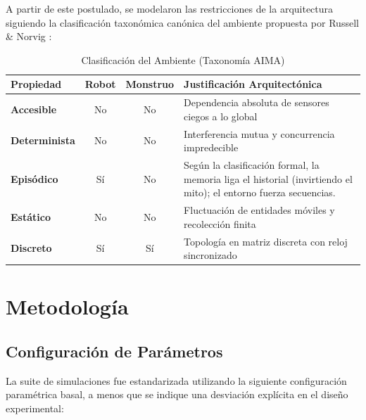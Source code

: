 \documentclass[conference]{IEEEtran}
\begin{document}
A partir de este postulado, se modelaron las restricciones de la arquitectura siguiendo la clasificación taxonómica canónica del ambiente propuesta por Russell \& Norvig \cite{russell2010artificial}:

\begin{table}[htbp]
\caption{Clasificación del Ambiente (Taxonomía AIMA)}
\begin{center}
\begin{tabular}{|l|c|c|>{\raggedright\arraybackslash}p{3.5cm}|}
\hline
\textbf{Propiedad} & \textbf{Robot} & \textbf{Monstruo} & \textbf{Justificación Arquitectónica} \\
\hline
\textbf{Accesible} & No & No & Dependencia absoluta de sensores ciegos a lo global \\
\textbf{Determinista} & No & No & Interferencia mutua y concurrencia impredecible \\
\textbf{Episódico} & Sí & No & Según la clasificación formal, la memoria liga el historial (invirtiendo el mito); el entorno fuerza secuencias. \\
\textbf{Estático} & No & No & Fluctuación de entidades móviles y recolección finita \\
\textbf{Discreto} & Sí & Sí & Topología en matriz discreta con reloj sincronizado \\
\hline
\end{tabular}
\end{center}
\end{table}

\section{Metodología}

\subsection{Configuración de Parámetros}
La suite de simulaciones fue estandarizada utilizando la siguiente configuración paramétrica basal, a menos que se indique una desviación explícita en el diseño experimental:
\end{document}
